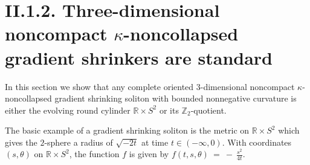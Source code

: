 \documentclass[12pt]{amsart}
\newcommand{\R}{{\mathbb R}}
\newcommand{\Z}{{\mathbb Z}}
\numberwithin{equation}{section}
\theoremstyle{plain}
\theoremstyle{definition}
\theoremstyle{remark}
\begin{document}
\section{II.1.2. Three-dimensional noncompact $\kappa$-noncollapsed
gradient shrinkers are standard}
\label{II.1.2}

In this section we show that any complete oriented 
$3$-dimensional noncompact 
$\kappa$-noncollapsed 
gradient shrinking soliton with
bounded nonnegative curvature
is either the evolving round cylinder $\R \times S^2$ or its
$\Z_2$-quotient.

The basic example of a gradient shrinking soliton is the
metric on $\R \times S^2$ which gives the $2$-sphere
a radius of $\sqrt{-2t}$ at time $t \in (-\infty, 0)$. With
coordinates $(s, \theta)$ on $\R \times S^2$, the function $f$ is given by
$f(t, s, \theta) \: = \: - \: \frac{s^2}{4t}$.
\end{document}
